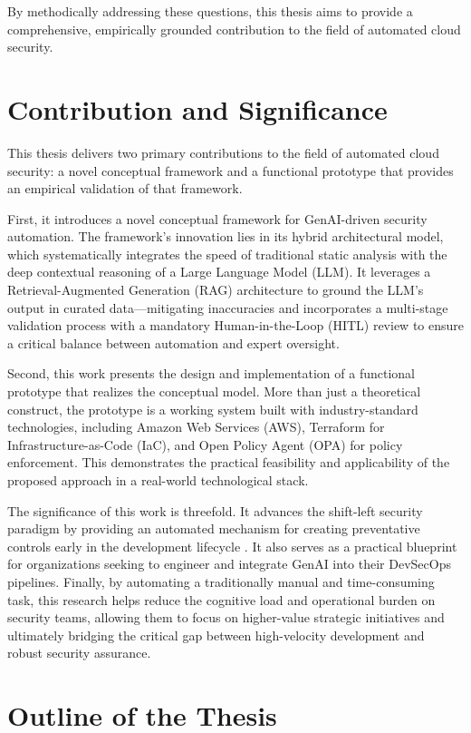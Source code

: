 By methodically addressing these questions, this thesis aims to provide a comprehensive, empirically grounded contribution to the field of automated cloud security.

\section{Contribution and Significance}
\label{sec:contribution}

This thesis delivers two primary contributions to the field of automated cloud security: a novel conceptual framework and a functional prototype that provides an empirical validation of that framework.

First, it introduces a novel conceptual framework for GenAI-driven security automation. The framework's innovation lies in its hybrid architectural model, which systematically integrates the speed of traditional static analysis with the deep contextual reasoning of a Large Language Model (LLM). It leverages a Retrieval-Augmented Generation (RAG) architecture to ground the LLM's output in curated data—mitigating inaccuracies and incorporates a multi-stage validation process with a mandatory Human-in-the-Loop (HITL) review to ensure a critical balance between automation and expert oversight.

Second, this work presents the design and implementation of a functional prototype that realizes the conceptual model. More than just a theoretical construct, the prototype is a working system built with industry-standard technologies, including Amazon Web Services (AWS), Terraform for Infrastructure-as-Code (IaC), and Open Policy Agent (OPA) for policy enforcement. This demonstrates the practical feasibility and applicability of the proposed approach in a real-world technological stack.

The significance of this work is threefold. It advances the shift-left security paradigm by providing an automated mechanism for creating preventative controls early in the development lifecycle \cite{akto_shift_2025}. It also serves as a practical blueprint for organizations seeking to engineer and integrate GenAI into their DevSecOps pipelines. Finally, by automating a traditionally manual and time-consuming task, this research helps reduce the cognitive load and operational burden on security teams, allowing them to focus on higher-value strategic initiatives and ultimately bridging the critical gap between high-velocity development and robust security assurance.

\section{Outline of the Thesis}
\label{sec:outline}


